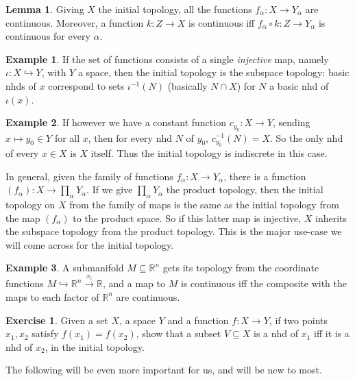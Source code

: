 \documentclass{tufte-handout}
\def\into {\hookrightarrow}
\def\RR{\mathbb{R}}
\newcommand{\lecturenum}[1]{\marginnote{\color{red}Lecture #1}}
\theoremstyle{definition}
\newtheorem{lemma}{Lemma}
\newtheorem{example}{Example}
\newtheorem{ex}{Exercise}
\begin{document}
\begin{lemma} 
Giving $X$ the initial topology, all the functions $f_\alpha\colon X\to 
Y_\alpha$ are continuous. Moreover, a function $k\colon Z\to X$ is continuous iff 
$f_\alpha\circ k\colon Z\to Y_\alpha$ is continuous for every $\alpha$. 
\end{lemma}

\begin{example}\lecturenum{2}
If the set of functions consists of a single \emph{injective} map, namely $\iota\colon X\into Y$, with
$Y$ a space, then the initial topology is the subspace topology: basic nhds of $x$ correspond 
to sets $\iota^{-1}(N)$ (basically $N\cap X$) for $N$ a basic nhd of $\iota(x)$.
\end{example}

\begin{example}
If however we have a constant function $c_{y_0}\colon X\to Y$, sending $x\mapsto y_0 \in Y$ for all $x$, then
for every nhd $N$ of $y_0$, $c_{y_0}^{-1}(N) = X$. So the only nhd of every $x\in X$ is $X$ itself.
Thus the initial topology is indiscrete in this case. 
\end{example}

In general, given the family of functions $f_\alpha\colon X\to Y_\alpha$, there is a function
$(f_\alpha)\colon X\to \prod_\alpha Y_\alpha$. If we give $\prod_\alpha Y_\alpha$ the product 
topology, then the initial topology on $X$ from the family of maps is the same as the initial
topology from the map $(f_\alpha)$ to the product space. So if this latter map is injective,
$X$ inherits the subspace topology from the product topology. This is the major use-case we
will come across for the initial topology.

\begin{example}
A submanifold $M\subseteq \RR^n$ gets its topology from the coordinate functions 
$M\into \RR^n \xrightarrow{x_i} \RR$, and a map to $M$ is continuous iff the composite with
the maps to each factor of $\RR^n$ are continuous.
\end{example}


\begin{ex}
Given a set $X$, a space $Y$ and a function $f\colon X\to Y$, if two points $x_1,x_2$ 
satisfy $f(x_1)=f(x_2)$, show that a subset $V\subseteq X$ is a nhd of $x_1$ iff it is a nhd
of $x_2$, in the initial topology.
\end{ex}

The following will be even more important for us, and will be new to most.
\end{document}
